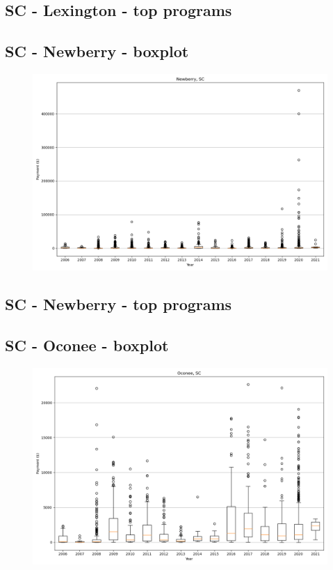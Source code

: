 \subsection*{SC - Lexington - top programs}

\newpage
\subsection*{SC - Newberry - boxplot}
\begin{figure}[h]
\centering
\includegraphics[width=7in]{../output/boxplots/counties/Newberry-SC_boxplot.png}
\end{figure}


\subsection*{SC - Newberry - top programs}

\newpage
\subsection*{SC - Oconee - boxplot}
\begin{figure}[h]
\centering
\includegraphics[width=7in]{../output/boxplots/counties/Oconee-SC_boxplot.png}
\end{figure}


